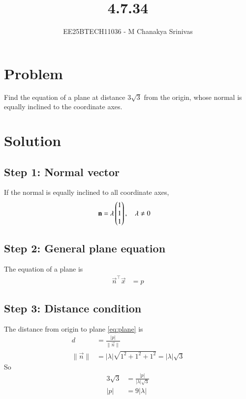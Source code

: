 \documentclass[journal]{IEEEtran}
\begin{document}

\vspace{3cm}

\title{4.7.34}
\author{EE25BTECH11036 - M Chanakya Srinivas}
\maketitle

\renewcommand{\thetable}{\theenumi}
\setlength{\intextsep}{10pt}
\renewcommand\theequation{\arabic{equation}}


\section*{Problem}
Find the equation of a plane at distance $3\sqrt{3}$ from the origin, whose normal is equally inclined to the coordinate axes.

\section*{Solution}

\subsection*{Step 1: Normal vector}
If the normal is equally inclined to all coordinate axes,
\begin{align}
\mathbf{n} &= \lambda \begin{pmatrix}1\\1\\1\end{pmatrix}, \quad \lambda \neq 0
\end{align}

\subsection*{Step 2: General plane equation}
The equation of a plane is
\begin{align}
\vec{n}^\top \vec{x} &= p \label{eq:plane}
\end{align}

\subsection*{Step 3: Distance condition}
The distance from origin to plane \eqref{eq:plane} is
\begin{align}
d &= \frac{|p|}{\|\vec{n}\|} \\
\|\vec{n}\| &= |\lambda|\sqrt{1^2+1^2+1^2} = |\lambda|\sqrt{3}
\end{align}
So
\begin{align}
3\sqrt{3} &= \frac{|p|}{|\lambda|\sqrt{3}} \\
|p| &= 9|\lambda|
\end{align}
\end{document}
